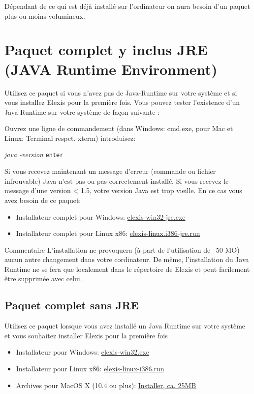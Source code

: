 Dépendant de ce qui est déjà installé sur l'ordinateur on aura besoin d'un paquet plus ou moins volumineux.

\section{Paquet complet y inclus JRE (JAVA Runtime Environment)}

Utilisez ce paquet si vous n'avez pas de Java-Runtime sur votre système et si vous installez Elexis pour la première fois. Vous pouvez tester l'existence d'un Java-Runtime sur votre système de façon suivante : 

Ouvrez une ligne de commandement (dans Windows: cmd.exe, pour Mac et Linux: Terminal respct. xterm) introduisez:

\textit{java -version} \texttt{enter}

Si vous recevez maintenant un message d'erreur (commande ou fichier infrouvable) Java n'est pas ou pas correctement installé. Si vous recevez le message d'une version < 1.5, votre version Java est trop vieille. En ce cas vous avez besoin de ce paquet:
\begin{itemize}
 \item Installateur complet pour Windows:  \href{http://www.elexis.ch/download.php?file=demo} {elexis-win32-jre.exe}
\item Installateur complet pour Linux x86:  \href{http://www.elexis.ch/download.php?file=elexis-linux-jre-i386}{elexis-linux.i386-jre.run}


\end{itemize}


Commentaire
L'installation ne provoquera (à part de l'utilisation de ~50 MO) aucun autre changement dans votre cordinateur. De même, l'installation du Java Runtime ne se fera que localement dans le répertoire de Elexis et peut facilement être supprimée avec celui.
%
%
\subsection{Paquet complet sans JRE}
Utilisez ce paquet lorsque vous avez installé un Java Runtime sur votre système et vous souhaitez installer Elexis pour la première fois
\begin{itemize}
 \item Installateur pour Windows:  \href{http://www.rgw.ch/download.php?file=elexis-win32}{elexis-win32.exe}
\item Installateur pour Linux x86:  \href{http://www.elexis.ch/download.php?file=elexis-linux-i386}{elexis-linux-i386.run}
\item Archives pour MacOS X (10.4 ou plus): \href{http://www.elexis.ch/download.php?file=elexis-mac}{Installer, ca. 25MB}
\end{itemize}

